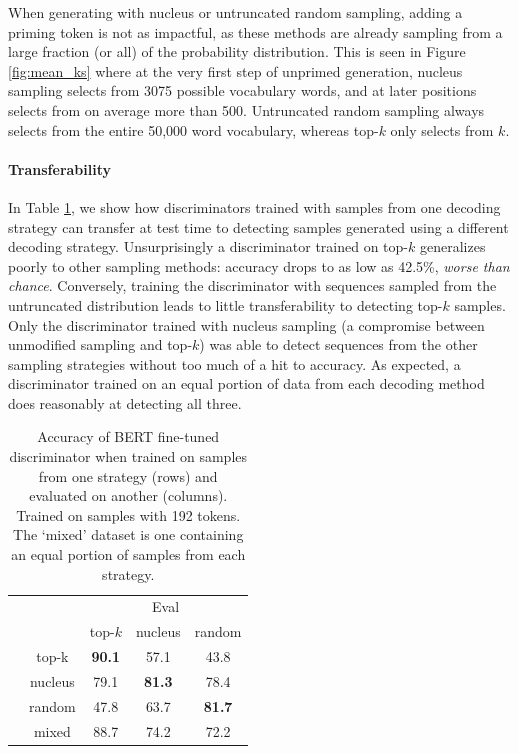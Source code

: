 When generating with nucleus or untruncated random sampling, adding a priming token is not as impactful, as these methods are already sampling from a large fraction (or all) of the probability distribution.
This is seen in Figure \ref{fig:mean_ks} where at the very first step of unprimed generation, nucleus sampling selects from 3075 possible vocabulary words, and at later positions selects from on average more than 500.
Untruncated random sampling always selects from the entire 50,000 word vocabulary, whereas top-$k$ only selects from $k$.


\paragraph{Transferability}
In Table \ref{tab:transfer_accuracy}, we show how discriminators trained with samples from one decoding strategy can transfer at test time to detecting samples generated using a different decoding strategy.
Unsurprisingly a discriminator trained on top-$k$ generalizes poorly to other sampling methods: accuracy drops to as low as 42.5\%, \textit{worse than chance}.
Conversely, training the discriminator with sequences sampled from the untruncated distribution leads to little transferability to detecting top-$k$ samples.
Only the discriminator trained with nucleus sampling (a compromise between unmodified sampling and top-$k$) was able to detect sequences from the other sampling strategies without too much of a hit to accuracy.
As expected, a discriminator trained on an equal portion of data from each decoding method does reasonably at detecting all three.


\begin{table}[t]
  \small
  \centering
  \caption{Accuracy of BERT fine-tuned discriminator when trained on samples from one strategy (rows) and evaluated on another (columns). Trained on samples with 192 tokens. The `mixed' dataset is one containing an equal portion of samples from each strategy.}
  \label{tab:transfer_accuracy}
  \begin{tabular}{c c|c|c|c}
    \toprule
    & & \multicolumn{3}{c}{Eval} \\
    \cline{3-5}
    &            & top-$k$         & nucleus & random \\
    \hline
    \multirow{3}{0.7em}{\rotatebox[origin=c]{90}{\parbox[c]{1cm}{\centering Train}}} 
    & \multicolumn{1}{|c|}{top-k}   & \textbf{90.1} & 57.1          & 43.8 \\
    & \multicolumn{1}{|c|}{nucleus} & 79.1          & \textbf{81.3} & 78.4 \\
    & \multicolumn{1}{|c|}{random}  & 47.8          & 63.7          & \textbf{81.7} \\
    \hline
    & \multicolumn{1}{|c|}{mixed}  & 88.7          & 74.2          & 72.2 \\
    \bottomrule
  \end{tabular}
\end{table}

